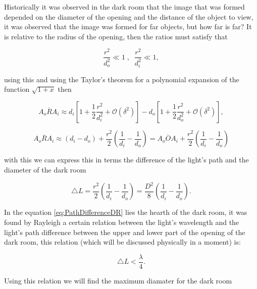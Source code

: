         Historically it was observed in the dark room that the image that was formed depended on the diameter of the opening and the distance of the object to view, it was observed that the image was formed for far objects, but how far is far? It is relative to the radius of the opening, then the ratios must satisfy that

        \begin{equation}
            \frac{r^2}{d_o^2} \ll 1\;,\;\;\frac{r^2}{d_i^2} \ll 1,
        \end{equation}

        using this and using the Taylor's theorem for a polynomial expansion of the function $\sqrt{1+x}$ then

        \begin{equation}
            \overline{A_oRA_i} \approx d_i\left[1 + \frac{1}{2}\frac{r^2}{d_i^2} + \mathcal{O}(\delta^2) \right] - d_o\left[ 1 + \frac{1}{2}\frac{r^2}{d_o^2} + \mathcal{O}(\delta^2) \right],
        \end{equation}

        \begin{equation}
            \overline{A_oRA_i} \approx \left(d_i-d_o\right) + \frac{r^2}{2}\left(\frac{1}{d_i} - \frac{1}{d_o} \right) = \overline{A_oOA_i} + \frac{r^2}{2}\left(\frac{1}{d_i} - \frac{1}{d_o} \right)
        \end{equation}

        with this we can express this in terms the difference of the light's path and the diameter of the dark room

        \begin{equation}\label{eq:PathDifferenceDR}
            \triangle L = \frac{r^2}{2}\left(\frac{1}{d_i} - \frac{1}{d_o} \right) = \frac{D^2}{8}\left(\frac{1}{d_i} - \frac{1}{d_o} \right).
        \end{equation}

        In the equation \ref{eq:PathDifferenceDR} lies the hearth of the dark room, it was found by Rayleigh a certain relation between the light's wavelength and the light's path difference between the upper and lower part of the opening of the dark room, this relation (which will be discussed physically in a moment) is:

        \begin{equation}\label{eq:RayleighIneq}
            \triangle L < \frac{\lambda}{4}.
        \end{equation}

        Using this relation we will find the maximum diamater for the dark room


